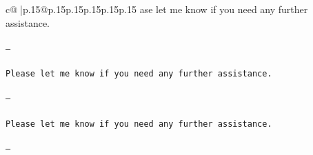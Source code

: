 \documentclass{article}
\begin{document}
{\begin{supertabular}{c@{$\;$}|p{.15\linewidth}@{}p{.15\linewidth}p{.15\linewidth}p{.15\linewidth}p{.15\linewidth}p{.15\linewidth}}
{{{ase let me know if you need any further assistance. \\ \tt \\ \tt ---\\ \tt \\ \tt Please let me know if you need any further assistance. \\ \tt \\ \tt ---\\ \tt \\ \tt Please let me know if you need any further assistance. \\ \tt \\ \tt ---}}}
\end{supertabular}}
\end{document}
